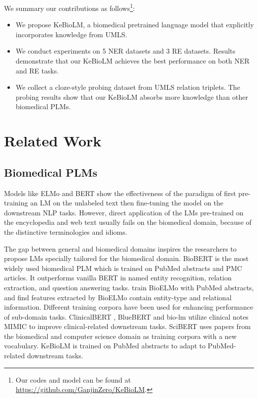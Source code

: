 \documentclass[11pt]{article}
\begin{document}
We summary our contributions as follows\footnote{Our codes and model can be found at \url{https://github.com/GanjinZero/KeBioLM}.}:
\begin{itemize}
\item We propose KeBioLM, a biomedical pretrained language model that explicitly incorporates knowledge from UMLS.
\item We conduct experiments on 5 NER datasets and 3 RE datasets. Results demonstrate that our KeBioLM achieves the best performance on both NER and RE tasks.
\item We collect a cloze-style probing dataset from UMLS relation triplets. The probing results show that our KeBioLM absorbs more knowledge than other biomedical PLMs. 
\end{itemize}

\section{Related Work}


\subsection{Biomedical PLMs}
Models like ELMo \cite{peters-etal-2018-deep} and BERT \cite{devlin-etal-2019-bert} 
show 
the effectiveness 
of the paradigm of first pre-training an LM on the unlabeled text
then fine-tuning the model on the downstream NLP tasks.
However, 
direct application
of the LMs pre-trained on the encyclopedia and web text
usually fails
on the biomedical domain,
because of the distinctive terminologies and idioms.

The gap between general and biomedical domains
inspires the researchers to propose LMs specially tailored for the biomedical domain.
BioBERT \cite{lee2020biobert} is the most widely used biomedical PLM 
which is trained on PubMed abstracts and PMC articles. 
It outperforms vanilla BERT in named entity recognition, relation extraction, and question answering tasks.
\citet{jin2019probing} train BioELMo with PubMed abstracts, and find features extracted by BioELMo contain entity-type and relational information.
Different training corpora have been used for enhancing performance of sub-domain tasks.
ClinicalBERT \cite{alsentzer-etal-2019-publicly}, BlueBERT \cite{peng-etal-2019-transfer} and bio-lm \cite{lewis-etal-2020-pretrained} utilize clinical notes MIMIC to improve clinical-related downstream tasks.
SciBERT \cite{beltagy-etal-2019-scibert} uses papers from the biomedical and computer science domain as training corpora with a new vocabulary.
KeBioLM is trained on PubMed abstracts to adapt to PubMed-related downstream tasks.
\end{document}
